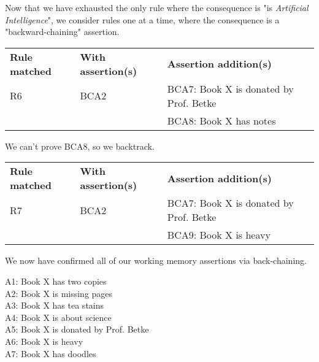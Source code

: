 \documentclass[11pt,largemargins, anonymous]{homework}
\begin{document}
Now that we have exhausted the only rule where the consequence is
"is \textit{Artificial Intelligence}",
we consider rules one at a time,
where the consequence is a "backward-chaining" assertion.

\begin{tabular}{lll}
    \textbf{Rule matched} & \textbf{With assertion(s)} & \textbf{Assertion addition(s)} \\
    R6 & BCA2 & BCA7: Book X is donated by Prof. Betke \\
    & & BCA8: Book X has notes
\end{tabular}

We can't prove BCA8, so we backtrack.

\begin{tabular}{lll}
    \textbf{Rule matched} & \textbf{With assertion(s)} & \textbf{Assertion addition(s)} \\
    R7 & BCA2 & BCA7: Book X is donated by Prof. Betke \\
    & & BCA9: Book X is heavy
\end{tabular}

We now have confirmed all of our working memory assertions via back-chaining.

\question

A1: Book X has two copies \\
A2: Book X is missing pages \\
A3: Book X has tea stains \\
A4: Book X is about science \\
A5: Book X is donated by Prof. Betke \\
A6: Book X is heavy \\
A7: Book X has doodles
\end{document}
